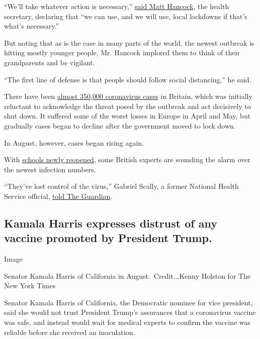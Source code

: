``We'll take whatever action is necessary,''
\href{https://www.bbc.com/news/uk-54050342}{said Matt Hancock}, the
health secretary, declaring that ``we can use, and we will use, local
lockdowns if that's what's necessary.''

But noting that as is the case in many parts of the world, the newest
outbreak is hitting mostly younger people, Mr. Hancock implored them to
think of their grandparents and be vigilant.

``The first line of defense is that people should follow social
distancing,'' he said.

There have been
\href{https://www.nytimes3xbfgragh.onion/interactive/2020/world/europe/united-kingdom-coronavirus-cases.html}{almost
350,000 coronavirus cases} in Britain, which was initially reluctant to
acknowledge the threat posed by the outbreak and act decisively to shut
down. It suffered some of the worst losses in Europe in April and May,
but gradually cases began to decline after the government moved to lock
down.

In August, however, cases began rising again.

With
\href{https://www.nytimes3xbfgragh.onion/2020/08/29/world/europe/britain-schools-reopen-cornavirus.html}{schools
newly reopened}, some British experts are sounding the alarm over the
newest infection numbers.

``They've lost control of the virus,'' Gabriel Scally, a former National
Health Service official,
\href{https://www.theguardian.com/world/2020/sep/06/coronavirus-fears-uk-government-lost-control-cases-soar}{told
The Guardian}.

\hypertarget{kamala-harris-expresses-distrust-of-any-vaccine-promoted-by-president-trump}{%
\subsection{Kamala Harris expresses distrust of any vaccine promoted by
President
Trump.}\label{kamala-harris-expresses-distrust-of-any-vaccine-promoted-by-president-trump}}

Image

Senator Kamala Harris of California in August.~Credit...Kenny Holston
for The New York Times

Senator Kamala Harris of California, the Democratic nominee for vice
president, said she would not trust President Trump's assurances that a
coronavirus vaccine was safe, and instead would wait for medical experts
to confirm the vaccine was reliable before she received an inoculation.

